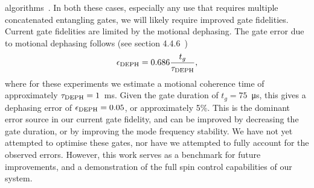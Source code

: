    algorithms~\cite{varona2024towards,brenner2024factoring}.  In both these cases, especially any use that requires
    multiple concatenated entangling gates, we will likely require improved gate
    fidelities. 
    Current gate fidelities are limited by the motional dephasing. The gate error due to motional dephasing follows (see section 4.4.6~\cite{ballance2017high-fidelity})
    \begin{equation}
        \epsilon_{\rm DEPH} = 0.686 \frac{t_g}{\tau_{\rm DEPH}},
    \end{equation}
    where for these experiments we estimate a motional coherence time of approximately $\tau_{\rm DEPH} = 1$~\unit{\ms}. Given the gate duration of $t_g = 75$~\unit{\us}, this gives a dephasing error of $\epsilon_{\rm DEPH} = 0.05$, or approximately 5\%. This is the dominant error source in our current gate fidelity, and can be improved by decreasing the gate duration, or by improving the mode frequency stability. We have not yet attempted to optimise these gates, nor have we attempted to fully account for the observed errors. However, this work serves as a benchmark for future improvements, and a demonstration of the full spin control capabilities of our system. \\
    